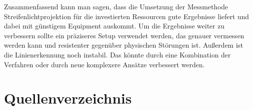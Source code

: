 \documentclass[ngerman,a4paper,parskip=half]{scrartcl}
\begin{document}
Zusammenfassend kann man sagen, dass die Umsetzung der Messmethode Streifenlichtprojektion für die investierten Ressourcen gute Ergebnisse liefert und dabei mit günstigem Equipment auskommt.
Um die Ergebnisse weiter zu verbessern sollte ein präziseres Setup verwendet werden, das genauer vermessen werden kann und resistenter gegenüber physischen Störungen ist. Außerdem ist die Linienerkennung noch instabil. Das könnte durch eine Kombination der Verfahren oder durch neue komplexere Ansätze verbessert werden.


\newpage

\section{Quellenverzeichnis}




\nocite{Haeming10sfm}
\nocite{Tomasi98stereomatching}
\nocite{manfred81math}
\nocite{opencv}
\nocite{particle}


\renewcommand*{\refname}{\arabic{section}\hspace{1em}Quellenverzeichnis}
\renewcommand*{\section}[2]{}



\end{document}
